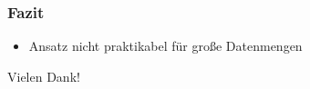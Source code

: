 \documentclass[12pt, xcolor=table]{beamer}
\begin{document}
\begin{frame}
    \frametitle{Fazit}
    \begin{itemize}
    \item Ansatz nicht praktikabel für große Datenmengen
    \end{itemize}
\end{frame}

\begin{frame}
\centerline{Vielen Dank!}
\end{frame}

\end{document}
